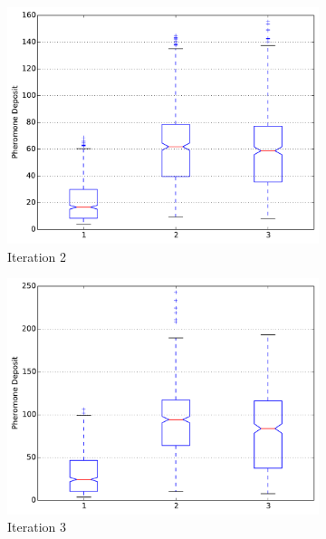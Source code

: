 \documentclass{llncs}
\begin{document}
\begin{figure}[H]
        \begin{subfigure}[b]{0.3\textwidth}
                \includegraphics[width=\textwidth]{PLT/Comparision/BOXPLOT/Iteration2}
                \caption{Iteration 2}
                \label{fig:plt_iter2}
        \end{subfigure}%
        \quad
        \begin{subfigure}[b]{0.3\textwidth}
                \includegraphics[width=\textwidth]{PLT/Comparision/BOXPLOT/Iteration3}
                \caption{Iteration 3}
                \label{fig:plt_iter3}
        \end{subfigure}
        \quad
        \begin{subfigure}[b]{0.3\textwidth}

\end{subfigure}
\end{figure}
\end{document}
